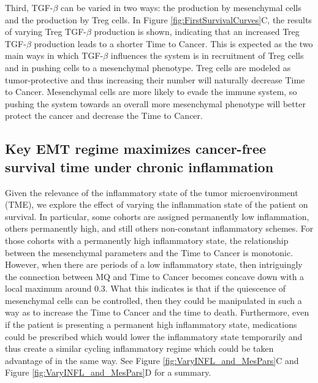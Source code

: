 \documentclass{article}
\begin{document}
Third, TGF-$\beta$ can be varied in two ways: the production by mesenchymal cells and the production by Treg cells.
In Figure \ref{fig:FirstSurvivalCurves}C, the results of varying Treg TGF-$\beta$ production is shown, indicating that an increased Treg TGF-$\beta$ production leads to a shorter Time to Cancer.
This is expected as the two main ways in which TGF-$\beta$ influences the system is in recruitment of Treg cells and in pushing cells to a mesenchymal phenotype.
Treg cells are modeled as tumor-protective and thus increasing their number will naturally decrease Time to Cancer.
Mesenchymal cells are more likely to evade the immune system, so pushing the system towards an overall more mesenchymal phenotype will better protect the cancer and decrease the Time to Cancer.

\subsection{Key EMT regime maximizes cancer-free survival time under chronic inflammation}\label{KeyEMT}
Given the relevance of the inflammatory state of the tumor microenvironment (TME), we explore the effect of varying the inflammation state of the patient on survival.
In particular, some cohorts are assigned permanently low inflammation, others permanently high, and still others non-constant inflammatory schemes.
For those cohorts with a permanently high inflammatory state, the relationship between the mesenchymal parameters and the Time to Cancer is monotonic.
However, when there are periods of a low inflammatory state, then intriguingly the connection between MQ and Time to Cancer becomes concave down with a local maximum around 0.3.
What this indicates is that if the quiescence of mesenchymal cells can be controlled, then they could be manipulated in such a way as to increase the Time to Cancer and the time to death.
Furthermore, even if the patient is presenting a permanent high inflammatory state, medications could be prescribed which would lower the inflammatory state temporarily and thus create a similar cycling inflammatory regime which could be taken advantage of in the same way.
See Figure \ref{fig:VaryINFL_and_MesPars}C and Figure \ref{fig:VaryINFL_and_MesPars}D for a summary.
\end{document}
